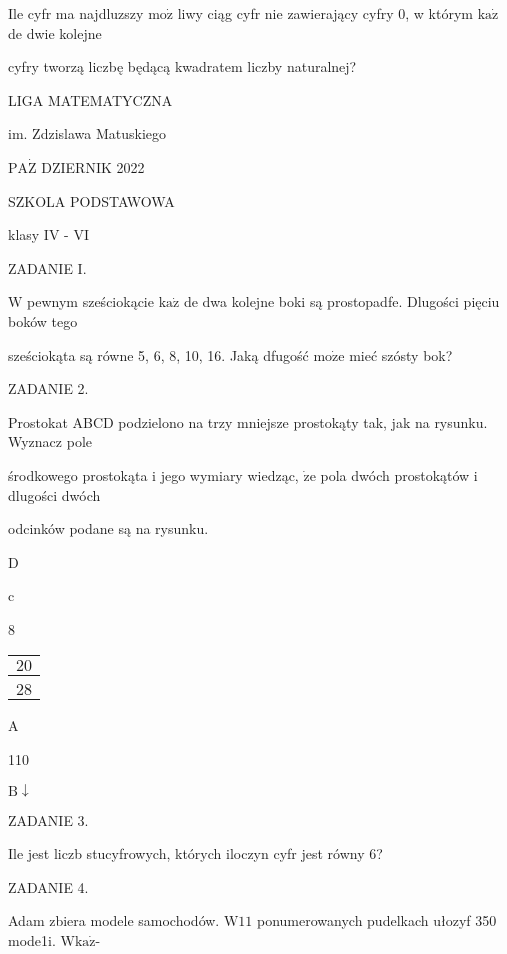 \documentclass[a4paper,12pt]{article}
\begin{document}
Ile cyfr ma najdluzszy $\mathrm{m}\mathrm{o}\dot{\mathrm{z}}$ liwy ciąg cyfr nie zawierający cyfry 0, w którym $\mathrm{k}\mathrm{a}\dot{\mathrm{z}}$ de dwie kolejne

cyfry tworzą liczbę będącą kwadratem liczby naturalnej?






LIGA MATEMATYCZNA

im. Zdzislawa Matuskiego

$\mathrm{P}\mathrm{A}\dot{\mathrm{Z}}$ DZIERNIK 2022

SZKOLA PODSTAWOWA

klasy IV - VI

ZADANIE I.

$\mathrm{W}$ pewnym sześciokącie $\mathrm{k}\mathrm{a}\dot{\mathrm{z}}$ de dwa kolejne boki są prostopadfe. Dlugości pięciu boków tego

sześciokąta są równe 5, 6, 8, 10, 16. Jaką dfugość $\mathrm{m}\mathrm{o}\dot{\mathrm{z}}\mathrm{e}$ mieć szósty bok?

ZADANIE 2.

Prostokat ABCD podzielono na trzy mniejsze prostokąty tak, jak na rysunku. Wyznacz pole

środkowego prostokąta i jego wymiary wiedząc, $\dot{\mathrm{z}}\mathrm{e}$ pola dwóch prostokątów i dlugości dwóch

odcinków podane są na rysunku.

D

c

8
\begin{center}
\begin{tabular}{|l|}
\hline
\multicolumn{1}{|l|}{$20$}	\\
\hline
\multicolumn{1}{|l|}{}	\\
\hline
\multicolumn{1}{|l|}{ $28$}	\\
\hline
\end{tabular}

\end{center}
A

110

$\mathrm{B}\downarrow$

ZADANIE 3.

Ile jest liczb stucyfrowych, których iloczyn cyfr jest równy 6?

ZADANIE 4.

Adam zbiera modele samochodów. $\mathrm{W}11$ ponumerowanych pudelkach ułozyf 350 mode1i. $\mathrm{W}\mathrm{k}\mathrm{a}\dot{\mathrm{z}}$-
\end{document}
